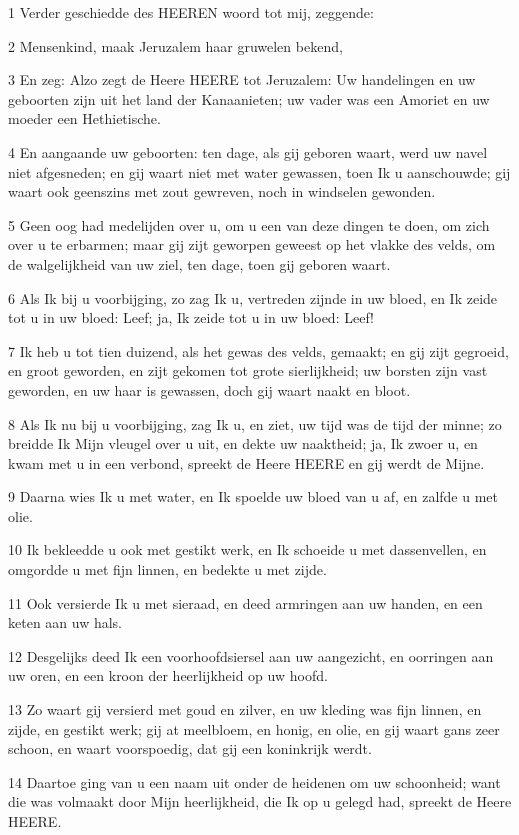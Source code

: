 \par 1 Verder geschiedde des HEEREN woord tot mij, zeggende:
\par 2 Mensenkind, maak Jeruzalem haar gruwelen bekend,
\par 3 En zeg: Alzo zegt de Heere HEERE tot Jeruzalem: Uw handelingen en uw geboorten zijn uit het land der Kanaanieten; uw vader was een Amoriet en uw moeder een Hethietische.
\par 4 En aangaande uw geboorten: ten dage, als gij geboren waart, werd uw navel niet afgesneden; en gij waart niet met water gewassen, toen Ik u aanschouwde; gij waart ook geenszins met zout gewreven, noch in windselen gewonden.
\par 5 Geen oog had medelijden over u, om u een van deze dingen te doen, om zich over u te erbarmen; maar gij zijt geworpen geweest op het vlakke des velds, om de walgelijkheid van uw ziel, ten dage, toen gij geboren waart.
\par 6 Als Ik bij u voorbijging, zo zag Ik u, vertreden zijnde in uw bloed, en Ik zeide tot u in uw bloed: Leef; ja, Ik zeide tot u in uw bloed: Leef!
\par 7 Ik heb u tot tien duizend, als het gewas des velds, gemaakt; en gij zijt gegroeid, en groot geworden, en zijt gekomen tot grote sierlijkheid; uw borsten zijn vast geworden, en uw haar is gewassen, doch gij waart naakt en bloot.
\par 8 Als Ik nu bij u voorbijging, zag Ik u, en ziet, uw tijd was de tijd der minne; zo breidde Ik Mijn vleugel over u uit, en dekte uw naaktheid; ja, Ik zwoer u, en kwam met u in een verbond, spreekt de Heere HEERE en gij werdt de Mijne.
\par 9 Daarna wies Ik u met water, en Ik spoelde uw bloed van u af, en zalfde u met olie.
\par 10 Ik bekleedde u ook met gestikt werk, en Ik schoeide u met dassenvellen, en omgordde u met fijn linnen, en bedekte u met zijde.
\par 11 Ook versierde Ik u met sieraad, en deed armringen aan uw handen, en een keten aan uw hals.
\par 12 Desgelijks deed Ik een voorhoofdsiersel aan uw aangezicht, en oorringen aan uw oren, en een kroon der heerlijkheid op uw hoofd.
\par 13 Zo waart gij versierd met goud en zilver, en uw kleding was fijn linnen, en zijde, en gestikt werk; gij at meelbloem, en honig, en olie, en gij waart gans zeer schoon, en waart voorspoedig, dat gij een koninkrijk werdt.
\par 14 Daartoe ging van u een naam uit onder de heidenen om uw schoonheid; want die was volmaakt door Mijn heerlijkheid, die Ik op u gelegd had, spreekt de Heere HEERE.
